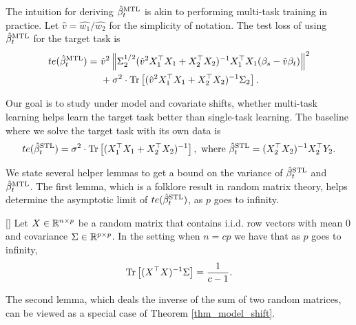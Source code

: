 The intuition for deriving $\hat{\beta}_t^{\text{MTL}}$ is akin to performing multi-task training in practice.
Let $\hat{v} = \hat{w_1} / \hat{w_2}$ for the simplicity of notation.
The test loss of using $\hat{\beta}_t^{\text{MTL}}$ for the target task is
\begin{align}
	te(\hat{\beta}_t^{\text{MTL}}) =&~ \hat{v}^2 \left\| \Sigma_2^{1/2}(\hat{v}^2 X_1^{\top}X_1 + X_2^{\top}X_2)^{-1} X_1^{\top}X_1 (\beta_s - \hat{v} \beta_t) \right\|^2 \nonumber \\
			&~ + \sigma^2 \cdot \operatorname{Tr}\left[(\hat{v}^2 X_1^{\top}X_1 + X_2^{\top}X_2)^{-1} \Sigma_2\right]. \label{eq_te_mtl_2task}
\end{align}

Our goal is to study under model and covariate shifts, whether multi-task learning helps learn the target task better than single-task learning.
The baseline where we solve the target task with its own data is
\begin{align*}
	te(\hat{\beta}_t^{\text{STL}}) = \sigma^2 \cdot \operatorname{Tr}\left[(X_1^{\top}X_1 + X_2^{\top}X_2)^{-1}\right], \text{ where } \hat{\beta}_t^{\text{STL}} = (X_2^{\top}X_2)^{-1} X_2^{\top}Y_2.
\end{align*}

We state several helper lemmas to get a bound on the variance of $\hat{\beta}_t^{\text{STL}}$ and $\hat{\beta}_t^{\text{MTL}}$.
The first lemma, which is a folklore result in random matrix theory, helps determine the asymptotic limit of $te(\hat{\beta}_t^{\text{STL}})$, as $p$ goes to infinity.

\begin{lemma}\label{lem_minv}[]
	Let $X\in\mathbb{R}^{n\times p}$ be a random matrix that contains i.i.d. row vectors with mean $0$ and covariance $\Sigma\in\mathbb{R}^{p\times p}$.
	In the setting when $n = c p$ we have that as $p$ goes to infinity,
	\[ \operatorname{Tr}\left[(X^{\top}X)^{-1}\Sigma\right] = \frac{1}{c - 1}. \]
\end{lemma}

The second lemma, which deals the inverse of the sum of two random matrices, can be viewed as a special case of Theorem \ref{thm_model_shift}.

